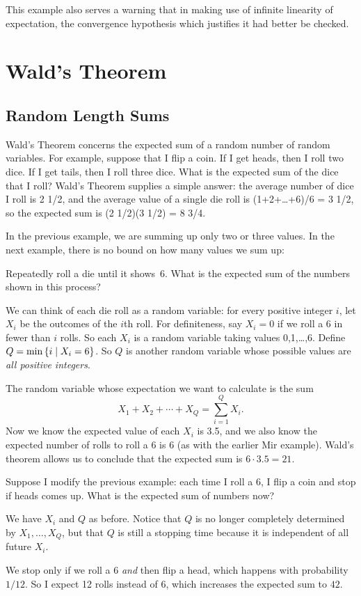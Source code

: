 \documentclass[11pt,twoside]{article}
\begin{document}
This example also serves a warning that in making use of infinite
linearity of expectation, the convergence hypothesis which justifies it
had better be checked.


\section{Wald's Theorem}

\subsection{Random Length Sums}

Wald's Theorem concerns the expected sum of a random number of random
variables.  For example, suppose that I flip a coin.  If I get heads, then
I roll two dice.  If I get tails, then I roll three dice.  What is the
expected sum of the dice that I roll?  Wald's Theorem supplies a simple
answer: the average number of dice I roll is 2 1/2, and the average value
of a single die roll is (1+2+\dots+6)/6 = 3 1/2, so the expected sum is (2
1/2)(3 1/2) = 8 3/4.

In the previous example, we are summing up only two or three values.  In
the next example, there is no bound on how many values we sum up:
\begin{example}
\label{ex:wald-dice} Repeatedly roll a die until it shows~6.  What is
the expected sum of the numbers shown in this process?

We can think of each die roll as a random variable: for every positive
integer $i$, let $X_i$ be the outcomes of the $i$th roll.  For
definiteness, say $X_i = 0$ if we roll a 6 in fewer than $i$ rolls.  So
each $X_i$ is a random variable taking values 0,1,\dots,6.  Define $Q =
\min\left\{i \mid X_i = 6\right\}$.  So $Q$ is another random variable whose
possible values are \emph{all positive integers}.

The random variable whose expectation we want to calculate is the sum
\[
X_1 + X_2 + \cdots + X_Q = \sum_{i=1}^Q X_i.
\]
Now we know the expected value of each $X_i$ is 3.5, and we also know the
expected number of rolls to roll a 6 is 6 (as with the earlier Mir
example).  Wald's theorem allows us to conclude that the expected sum is
$6\cdot 3.5=21$.
\end{example}

\begin{example}
  Suppose I modify the previous example: each time I roll a 6, I flip
  a coin and stop if heads comes up.  What is the expected sum of
  numbers now?
  
  We have $X_i$ and $Q$ as before.  Notice that $Q$ is no longer
  completely determined by $X_1,\ldots,X_Q$, but that $Q$ is still a
  stopping time because it is independent of all future $X_i$.
  
  We stop only if we roll a 6 \emph{and} then flip a head, which
  happens with probability $1/12$.  So I expect 12 rolls instead of 6,
  which increases the expected sum to $42$.
\end{example}
\end{document}

